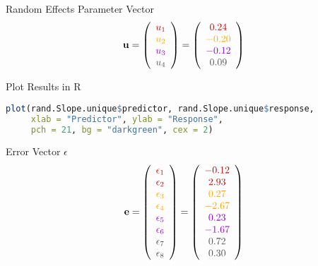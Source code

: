 \documentclass{beamer}
\begin{document}
\begin{frame}{Random Effects Parameter Vector}
\[
\mathbf{u} = \left( 
\begin{array}{c} 
\color{darkred}{u_1} \\ 
\color{orange}{u_2} \\ 
\color{violet}{u_3} \\ 
\color{darkgray}{u_4} 
\end{array}\right) = \left( 
\begin{array}{c} 
\color{darkred}{0.24} \\ 
\color{orange}{-0.20} \\ 
\color{violet}{-0.12} \\ 
\color{darkgray}{0.09} 
\end{array}\right)
\]
\end{frame}

\begin{frame}[fragile]{Plot Results in R}
\begin{lstlisting}[language=R]
plot(rand.Slope.unique$predictor, rand.Slope.unique$response, 
     xlab = "Predictor", ylab = "Response", 
     pch = 21, bg = "darkgreen", cex = 2)
\end{lstlisting}
\end{frame}


\begin{frame}{Error Vector $\epsilon$}
\[
\mathbf{e} = \left( 
\begin{array}{c} 
\color{darkred}{\epsilon_1} \\ 
\color{darkred}{\epsilon_2} \\ 
\color{orange}{\epsilon_3} \\ 
\color{orange}{\epsilon_4} \\ 
\color{violet}{\epsilon_5} \\ 
\color{violet}{\epsilon_6} \\ 
\color{darkgray}{\epsilon_7} \\ 
\color{darkgray}{\epsilon_8} 
\end{array}\right) = \left( 
\begin{array}{c} 
\color{darkred}{-0.12} \\ 
\color{darkred}{2.93} \\ 
\color{orange}{0.27} \\ 
\color{orange}{-2.67} \\ 
\color{violet}{0.23} \\ 
\color{violet}{-1.67} \\ 
\color{darkgray}{0.72} \\ 
\color{darkgray}{0.30} 
\end{array}\right)
\]
\end{frame}
\end{document}
